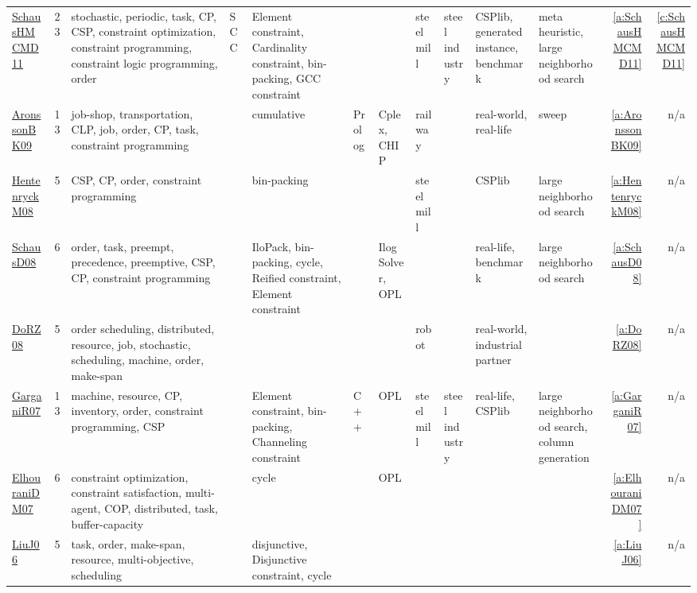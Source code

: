 {\begin{longtable}{>{\raggedright\arraybackslash}p{3cm}r>{\raggedright\arraybackslash}p{4cm}p{1.5cm}p{2cm}p{1.5cm}p{1.5cm}p{1.5cm}p{1.5cm}p{2cm}p{1.5cm}rr}
\href{../works/SchausHMCMD11.pdf}{SchausHMCMD11}~\cite{SchausHMCMD11} & 23 & stochastic, periodic, task, CP, CSP, constraint optimization, constraint programming, constraint logic programming, order & SCC & Element constraint, Cardinality constraint, bin-packing, GCC constraint &  &  & steel mill & steel industry & CSPlib, generated instance, benchmark & meta heuristic, large neighborhood search & \ref{a:SchausHMCMD11} & \ref{c:SchausHMCMD11}\\
\href{../works/AronssonBK09.pdf}{AronssonBK09}~\cite{AronssonBK09} & 13 & job-shop, transportation, CLP, job, order, CP, task, constraint programming &  & cumulative & Prolog & Cplex, CHIP & railway &  & real-world, real-life & sweep & \ref{a:AronssonBK09} & n/a\\
\href{../works/HentenryckM08.pdf}{HentenryckM08}~\cite{HentenryckM08} & 5 & CSP, CP, order, constraint programming &  & bin-packing &  &  & steel mill &  & CSPlib & large neighborhood search & \ref{a:HentenryckM08} & n/a\\
\href{../works/SchausD08.pdf}{SchausD08}~\cite{SchausD08} & 6 & order, task, preempt, precedence, preemptive, CSP, CP, constraint programming &  & IloPack, bin-packing, cycle, Reified constraint, Element constraint &  & Ilog Solver, OPL &  &  & real-life, benchmark & large neighborhood search & \ref{a:SchausD08} & n/a\\
\href{../works/DoRZ08.pdf}{DoRZ08}~\cite{DoRZ08} & 5 & order scheduling, distributed, resource, job, stochastic, scheduling, machine, order, make-span &  &  &  &  & robot &  & real-world, industrial partner &  & \ref{a:DoRZ08} & n/a\\
\href{../works/GarganiR07.pdf}{GarganiR07}~\cite{GarganiR07} & 13 & machine, resource, CP, inventory, order, constraint programming, CSP &  & Element constraint, bin-packing, Channeling constraint & C++ & OPL & steel mill & steel industry & real-life, CSPlib & large neighborhood search, column generation & \ref{a:GarganiR07} & n/a\\
\href{../works/ElhouraniDM07.pdf}{ElhouraniDM07}~\cite{ElhouraniDM07} & 6 & constraint optimization, constraint satisfaction, multi-agent, COP, distributed, task, buffer-capacity &  & cycle &  & OPL &  &  &  &  & \ref{a:ElhouraniDM07} & n/a\\
\href{../works/LiuJ06.pdf}{LiuJ06}~\cite{LiuJ06} & 5 & task, order, make-span, resource, multi-objective, scheduling &  & disjunctive, Disjunctive constraint, cycle &  &  &  &  &  &  & \ref{a:LiuJ06} & n/a\\

\end{longtable}}
